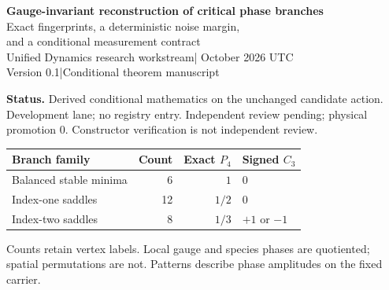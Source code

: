 \documentclass[11pt,a4paper]{article}
\begin{document}
\begin{center}
{\Large\bfseries Gauge-invariant reconstruction of critical phase branches}\\[8pt]
{\large Exact fingerprints, a deterministic noise margin,\\and a conditional measurement contract}\\[10pt]
Unified Dynamics research workstream\quad | October 2026 UTC\\
Version 0.1\quad |\quad Conditional theorem manuscript
\end{center}
\begin{abstract}
The curved-branch bifurcation theorem supplies 26 nearby scalar equilibria and their finite-rank embeddings. We construct a matter-dressed Wilson observable invariant under the full local gauge group. Its oriented phases reconstruct the three critical amplitudes exactly on the nonlinear stationary sheet: the fast correction cancels by weighted orthogonality. A scale-free fourth moment takes the exact values $1$, $1/2$ and $1/3$ on the three branch types. A signed cubic distinguishes the two body-diagonal orbits under vertex permutations. We prove a sufficient deterministic phase-error margin for class discrimination. Real-only loop and matter-density data are exactly blind to overall phase conjugation; six labeled real loop channels nevertheless give asymptotic class fingerprints by distance reconstruction. The inherited soft spectrum gives a clock-independent limiting frequency ratio. A proposed measurement contract and two-study primary-source screen delimit what would be needed for a physical test. No experimental result or physical correspondence is asserted.
\end{abstract}
\textbf{Status.} Derived conditional mathematics on the unchanged candidate action. Development lane; no registry entry. Independent review pending; physical promotion $0$. Constructor verification is not independent review.

\begin{center}\begin{tabular}{lrrl}
\toprule
Branch family & Count & Exact $P_4$ & Signed $C_3$\\\midrule
Balanced stable minima & 6 & $1$ & $0$\\
Index-one saddles & 12 & $1/2$ & $0$\\
Index-two saddles & 8 & $1/3$ & $+1$ or $-1$\\\bottomrule
\end{tabular}\end{center}
Counts retain vertex labels. Local gauge and species phases are quotiented; spatial permutations are not. Patterns describe phase amplitudes on the fixed carrier.
\end{document}
